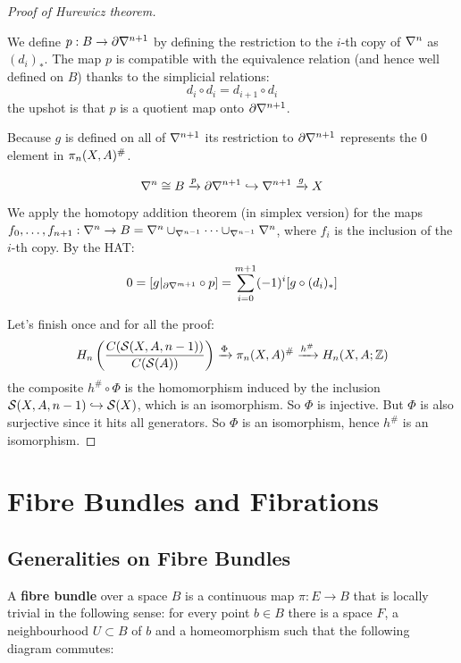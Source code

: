 \begin{proof}[Proof of Hurewicz theorem]
\begin{claimproof}
We define $p:B\to\partial\nabla^{n+1}$ by defining the restriction to the $i$-th copy of $\nabla^n$ as $(d_i)_*$. The map $p$ is compatible with the equivalence relation (and hence well defined on $B$) thanks to the simplicial relations:
\[d_i\circ d_i=d_{i+1}\circ d_i\]
the upshot is that $p$ is a quotient map onto $\partial\nabla^{n+1}$.

Because $g$ is defined on all of $\nabla^{n+1}$ its restriction to $\partial\nabla^{n+1}$ represents the $0$ element in $\pi_n(X,A)^\#$.

\[\nabla^n\cong B\xrightarrow{p}\partial\nabla^{n+1}\hookrightarrow\nabla^{n+1}\xrightarrow{g}X\]

We apply the homotopy addition theorem (in simplex version) for the maps ${{f}_0,\dots,{f}_{n+1}}:\nabla^{n}\to B=\nabla^{n}\cup_{\nabla^{n-1}}\dots\cup_{\nabla^{n-1}}\nabla^{n}$, where $f_i$ is the inclusion of the $i$-th copy.
By the HAT:
\[0=[g|_{\partial \nabla^{m+1}}\circ p]=\sum_{i=0}^{m+1}(-1)^i[g\circ (d_i)_*]\]

\end{claimproof}

Let's finish once and for all the proof:
\[H_n\left(\frac{C(\mathcal{S}(X,A,n-1))}{C(\mathcal{S}(A))}\right)\xrightarrow{\Phi}\pi_n(X,A)^\#\xrightarrow{h^\#}H_n(X,A;{\mathbb Z})\]
the composite $h^\#\circ\Phi$ is the homomorphism induced by the inclusion $\mathcal{S}(X,A,n-1)\hookrightarrow \mathcal{S}(X)$, which is an isomorphism. So $\Phi$ is injective. But $\Phi$ is also surjective since it hits all generators. So $\Phi$ is an isomorphism, hence $h^\#$ is an isomorphism.
\end{proof}



\chapter{Fibre Bundles and Fibrations}

\section{Generalities on Fibre Bundles}

A \textbf{fibre bundle} over a space $B$ is a continuous map $\pi:E\to B$ that is locally trivial in the following sense: for every point $b\in B$ there is a space $F$, a neighbourhood $U\subset B$ of $b$ and a homeomorphism such that the following diagram commutes:
\begin{center}
\end{center}

